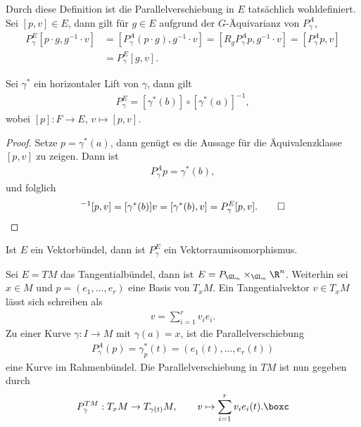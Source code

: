 \documentclass[%
	paper=a5,%
	fleqn,%
	DIV=18,%
	BCOR=0mm,
	fontsize=11pt,
	titlepage=false,%
	bibliography=totoc,
	DIV=18,%
	twoside=true,
	pdftitle=Riemannsche Geometrie,
	pdfauthor=Uwe Semmelmann,
	numbers=noendperiod]%
	{scrbook}
\begin{document}
\begin{rem}[Bemerkungen.]
\begin{remenum}
\item
Durch diese Definition ist die Parallelverschiebung in $E$
tatsächlich wohldefiniert. Sei $[p,v]\in E$, dann gilt für $g\in E$ aufgrund der
$G$-Äquivarianz von $P_\gamma^A$,
\begin{align*}
P_\gamma^E [p\cdot g,g^{-1}\cdot v]
&= \left[P_\gamma^A (p\cdot g),g^{-1}\cdot v \right]
= \left[R_g P_\gamma^A p,g^{-1}\cdot v \right]
= \left[P_\gamma^A p,v \right]\\
&= P_\gamma^E [g,v].
\end{align*}
\item Sei $\gamma^*$ ein horizontaler Lift von $\gamma$, dann gilt
\begin{align*}
P_\gamma^E = [\gamma^*(b)]\circ [\gamma^*(a)]^{-1},
\end{align*}
wobei $[p]\colon F\to E$, $v\mapsto [p,v]$.
\begin{proof}
Setze $p = \gamma^*(a)$, dann genügt es die Aussage für die Äquivalenzklasse
$[p,v]$ zu zeigen. Dann ist
\begin{align*}
P_\gamma^A p = \gamma^*(b),
\end{align*}
und folglich
\begin{align*}
[\gamma^*(b)][\gamma^*(a)]^{-1}[p,v]
= [\gamma^*(b)]v = 
[\gamma^*(b),v] = P_\gamma^E [p,v].\qed 
\end{align*}
\end{proof}
\item Ist $E$ ein Vektorbündel, dann ist $P_\gamma^E$ ein
Vektorraumisomorphismus.\map
\end{remenum}
\end{rem}

\begin{ex}
Sei $E= TM$ das Tangentialbündel, dann ist $E= P_{\GL_n}\times_{\GL_n} \R^n$.
Weiterhin sei $x\in M$ und $p = (e_1,\ldots,e_r)$ eine Basis von $T_xM$. Ein
Tangentialvektor $v\in T_xM$ lässt sich schreiben als
\begin{align*}
v = \sum_{i=1}^r v_i e_i.
\end{align*} 
Zu einer Kurve $\gamma\colon I\to M$ mit $\gamma(a) = x$, ist die
Parallelverschiebung
\begin{align*}
P_\gamma^A (p) = \gamma_p^*(t) = (e_1(t),\ldots,e_r(t))
\end{align*}
eine Kurve im Rahmenbündel. Die Parallelverschiebung in $TM$ ist nun gegeben
durch
\begin{align*}
P^{TM}_\gamma : T_xM\to T_{\gamma(t)}M,\qquad v\mapsto \sum_{i=1}^r v_i e_i(t).\boxc
\end{align*}
\end{ex}
\end{document}
